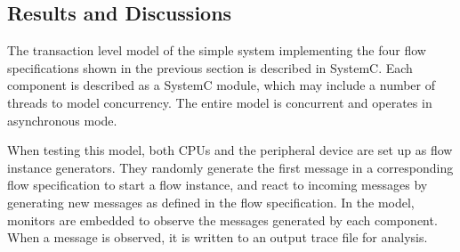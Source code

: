 \documentclass[conference]{IEEEtran}
\begin{document}
%
%
\subsection{Results and Discussions}
%
%
The transaction level model of the simple system implementing the four flow specifications shown in the previous section is described in SystemC.  Each component is described as a SystemC module, which may include a number of threads to model concurrency.  The entire model is concurrent and operates in asynchronous mode.  

When testing this model, both CPUs and the peripheral device are set up as flow instance generators.  They randomly generate the first message in a corresponding flow specification to start a flow instance, and react to incoming messages by generating new messages as defined in the flow specification.  In the model, monitors are embedded to observe the messages generated by each component.  When a message is observed, it is written to an output trace file for analysis.   
\end{document}
